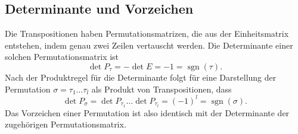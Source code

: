 \subsection{Determinante und Vorzeichen}
Die Transpositionen haben Permutationsmatrizen, die aus der Einheitsmatrix
entstehen, indem genau zwei Zeilen vertauscht werden.
Die Determinante einer solchen Permutationsmatrix ist
\[
\det P_{\tau} = - \det E = -1 = \operatorname{sgn}(\tau).
\]
Nach der Produktregel für die Determinante folgt für eine Darstellung
der Permutation $\sigma=\tau_1\dots\tau_l$ als Produkt von Transpositionen,
dass
\[
\det P_{\sigma}
=
\det P_{\tau_1} \dots \det P_{\tau_l}
=
(-1)^l
=
\operatorname{sgn}(\sigma).
\]
Das Vorzeichen einer Permutation ist also identisch mit der Determinante
der zugehörigen Permutationsmatrix.



